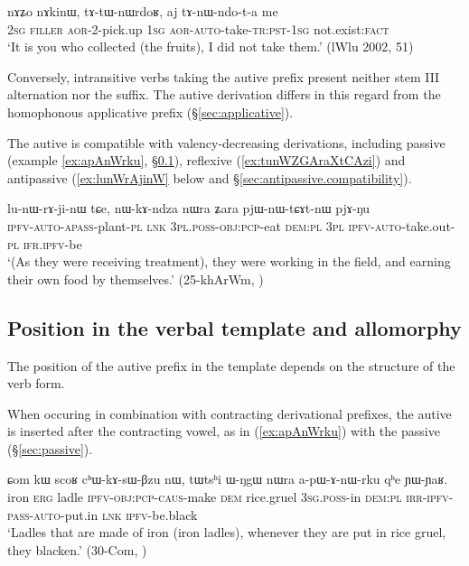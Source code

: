  \begin{exe}
\ex \label{ex:aj.tAnWndota.me}
\gll nɤʑo nɤkinɯ, tɤ-tɯ-nɯrdoʁ, aj tɤ-nɯ-ndo-t-a me\\
\textsc{2sg} \textsc{filler} \textsc{aor}-2-pick.up  \textsc{1sg}  \textsc{aor}-\textsc{auto}-take-\textsc{tr}:\textsc{pst}-\textsc{1sg} not.exist:\textsc{fact}\\
\glt `It is you who collected (the fruits), I did not take them.' (lWlu 2002, 51)
\end{exe}

Conversely, intransitive verbs taking the autive prefix present neither stem III alternation nor the  suffix. The autive derivation differs in this regard from the homophonous  applicative prefix (§\ref{sec:applicative}).

The autive is compatible with valency-decreasing derivations, including passive (example \ref{ex:apAnWrku}, §\ref{sec:autoben.position}), reflexive (\ref{ex:tunWZGAraXtCAzi}) and antipassive (\ref{ex:lunWrAjinW} below and §\ref{sec:antipassive.compatibility}).

 \begin{exe}
\ex \label{ex:lunWrAjinW}
\gll lu-nɯ-rɤ-ji-nɯ tɕe, nɯ-kɤ-ndza nɯra ʑara pjɯ-nɯ-tɕɤt-nɯ pjɤ-ŋu \\
\textsc{ipfv}-\textsc{auto}-\textsc{apass}-plant-\textsc{pl} \textsc{lnk} \textsc{3pl}.\textsc{poss}-\textsc{obj}:\textsc{pcp}-eat \textsc{dem}:\textsc{pl} \textsc{3pl} \textsc{ipfv}-\textsc{auto}-take.out-\textsc{pl} \textsc{ifr}.\textsc{ipfv}-be \\
\glt  `(As they were receiving treatment), they were working in the field, and earning their own food by themselves.' (25-khArWm, )
\end{exe}

\subsection{Position in the verbal template and allomorphy}  \label{sec:autoben.position}
 

The position of the autive prefix in the template depends on the structure of the verb form. 

When occuring in combination with contracting derivational prefixes, the autive  is inserted after the contracting vowel, as in (\ref{ex:apAnWrku}) with the passive  (§\ref{sec:passive}).

 \begin{exe}
\ex \label{ex:apAnWrku}
\gll ɕom kɯ scoʁ cʰɯ-kɤ-sɯ-βzu nɯ, tɯtsʰi ɯ-ŋgɯ nɯra a-pɯ-ɤ-nɯ-rku qʰe ɲɯ-ɲaʁ.  \\
iron \textsc{erg} ladle \textsc{ipfv}-\textsc{obj}:\textsc{pcp}-\textsc{caus}-make \textsc{dem} rice.gruel \textsc{3sg}.\textsc{poss}-in \textsc{dem}:\textsc{pl} \textsc{irr}-\textsc{ipfv}-\textsc{pass}-\textsc{auto}-put.in \textsc{lnk} \textsc{ipfv}-be.black \\
\glt `Ladles that are made of iron (iron ladles), whenever they are put in rice gruel, they blacken.' (30-Com, )
\end{exe}

